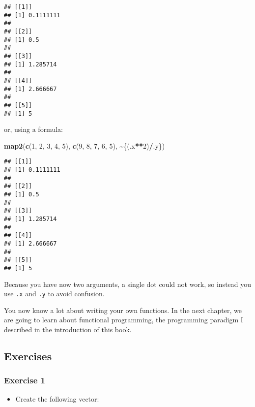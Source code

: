 \documentclass[
]{article}
\newenvironment{Shaded}{\begin{snugshade}}{\end{snugshade}}
\newcommand{\DecValTok}[1]{\textcolor[rgb]{0.00,0.00,0.81}{#1}}
\newcommand{\KeywordTok}[1]{\textcolor[rgb]{0.13,0.29,0.53}{\textbf{#1}}}
\newcommand{\NormalTok}[1]{#1}
\newcommand{\OperatorTok}[1]{\textcolor[rgb]{0.81,0.36,0.00}{\textbf{#1}}}
\providecommand{\tightlist}{%
  \setlength{\itemsep}{0pt}\setlength{\parskip}{0pt}}
\begin{document}
\begin{verbatim}
## [[1]]
## [1] 0.1111111
## 
## [[2]]
## [1] 0.5
## 
## [[3]]
## [1] 1.285714
## 
## [[4]]
## [1] 2.666667
## 
## [[5]]
## [1] 5
\end{verbatim}

or, using a formula:

\begin{Shaded}
\begin{Highlighting}[]
\KeywordTok{map2}\NormalTok{(}\KeywordTok{c}\NormalTok{(}\DecValTok{1}\NormalTok{, }\DecValTok{2}\NormalTok{, }\DecValTok{3}\NormalTok{, }\DecValTok{4}\NormalTok{, }\DecValTok{5}\NormalTok{), }\KeywordTok{c}\NormalTok{(}\DecValTok{9}\NormalTok{, }\DecValTok{8}\NormalTok{, }\DecValTok{7}\NormalTok{, }\DecValTok{6}\NormalTok{, }\DecValTok{5}\NormalTok{), }\OperatorTok{\textasciitilde{}}\NormalTok{\{(.x}\OperatorTok{**}\DecValTok{2}\NormalTok{)}\OperatorTok{/}\NormalTok{.y\})}
\end{Highlighting}
\end{Shaded}

\begin{verbatim}
## [[1]]
## [1] 0.1111111
## 
## [[2]]
## [1] 0.5
## 
## [[3]]
## [1] 1.285714
## 
## [[4]]
## [1] 2.666667
## 
## [[5]]
## [1] 5
\end{verbatim}

Because you have now two arguments, a single dot could not work, so instead you use \texttt{.x} and \texttt{.y} to
avoid confusion.

You now know a lot about writing your own functions. In the next chapter, we are going to learn about
functional programming, the programming paradigm I described in the introduction of this book.

\hypertarget{exercises-5}{%
\subsection{Exercises}\label{exercises-5}}

\hypertarget{exercise-1-5}{%
\subsubsection*{Exercise 1}\label{exercise-1-5}}

\begin{itemize}
\tightlist
\item
  Create the following vector:
\end{itemize}
\end{document}
